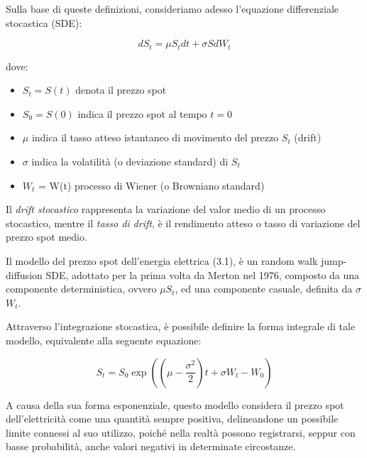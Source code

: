\documentclass[12pt,a4paper]{report}
\begin{document}
Sulla base di queste definizioni, consideriamo adesso l'equazione differenziale stocastica (SDE):

\begin{equation}
     dS_t = \mu S_t dt + \sigma S dW_t 
\end{equation}

dove: 
\begin{itemize}
    \item $S_t = S(t)$ denota il prezzo spot
    \item $S_0 = S(0)$ indica il prezzo spot al tempo $t=0$
    \item $\mu$ indica il tasso atteso istantaneo di movimento del prezzo $S_t$ (drift)
    \item $\sigma$ indica la volatilità (o deviazione standard) di $S_t$
    \item $W_t$ = W(t) processo di Wiener (o Browniano standard)
\end{itemize}

Il \textit{drift stocastico} rappresenta la variazione del valor medio di un processo stocastico, mentre il \textit{tasso di drift}, è il rendimento atteso o tasso di variazione del prezzo spot medio.

Il modello del prezzo spot dell'energia elettrica (3.1), è un random walk jump-diffusion SDE, adottato per la prima volta da Merton nel 1976, composto da una componente deterministica, ovvero $\mu$$S_t$, ed una componente casuale, definita da $\sigma$$W_t$.

Attraverso l'integrazione stocastica, è possibile definire la forma integrale di tale modello, equivalente alla seguente equazione:

\begin{equation}
    S_t = S_0 \exp\left(\left(\mu - \frac{\sigma^2}{2}\right)t + \sigma W_t -W_0\right)
\end{equation}

A causa della sua forma esponenziale, questo modello considera il prezzo spot dell'elettricità come una quantità sempre positiva, delineandone un possibile limite connessi al suo utilizzo, poiché nella realtà possono registrarsi, seppur con basse probabilità, anche valori negativi in determinate circostanze. 
\end{document}
